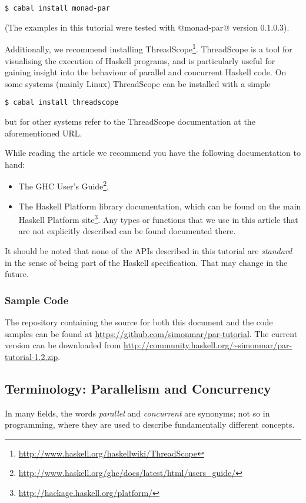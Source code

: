 \documentclass{llncs}
\newcommand{\Subsection}[2]{\subsection{#2}\label{sec:#1}}
\newcommand{\Subsubsection}[2]{\subsubsection{#2}\label{sec:#1}}
\newcommand{\version}{1.2}
\begin{document}
{\small \begin{verbatim}
$ cabal install monad-par
\end{verbatim}}

\noindent (The examples in this tutorial were tested with @monad-par@ version 0.1.0.3).

Additionally, we recommend installing
ThreadScope\footnote{\url{http://www.haskell.org/haskellwiki/ThreadScope}}.
ThreadScope is a tool for visualising the execution of Haskell
programs, and is particularly useful for gaining insight into the
behaviour of parallel and concurrent Haskell code.  On some systems
(mainly Linux) ThreadScope can be installed with a simple

{\small \begin{verbatim}
$ cabal install threadscope
\end{verbatim}}

\noindent but for other systems refer to the ThreadScope
documentation at the aforementioned URL.

While reading the article we recommend you have the following
documentation to hand:

\begin{itemize}
\item The GHC User's
  Guide\footnote{\url{http://www.haskell.org/ghc/docs/latest/html/users_guide/}},

\item The Haskell Platform library documentation, which can be found
  on the main Haskell Platform
  site\footnote{\url{http://hackage.haskell.org/platform/}}.  Any
  types or functions that we use in this article that are not
  explicitly described can be found documented there.
\end{itemize}

It should be noted that none of the APIs described in this tutorial
are \emph{standard} in the sense of being part of the Haskell
specification.  That may change in the future.

\Subsubsection{sample}{Sample Code}

The repository containing the source for both this document and the
code samples can be found at
\url{https://github.com/simonmar/par-tutorial}.  The current version
can be downloaded from
\url{http://community.haskell.org/~simonmar/par-tutorial-\version.zip}.

\Subsection{terminology}{Terminology: Parallelism and Concurrency}

In many fields, the words \emph{parallel} and \emph{concurrent} are
synonyms; not so in programming, where they are used to describe
fundamentally different concepts.
\end{document}
